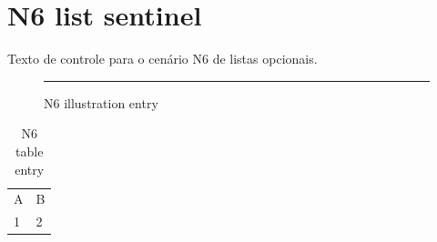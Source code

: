 \documentclass{abntexto-ufc}
\begin{document}
\pretextual

\imprimirlistadeilustracoes
\imprimirlistadetabelas
{}

\textual
\section{N6 list sentinel}
Texto de controle para o cenário N6 de listas opcionais.

\begin{figure}[h]
  \centering
  \rule{10cm}{2cm}
  \caption{N6 illustration entry}
\end{figure}

\begin{table}[h]
  \centering
  \caption{N6 table entry}
  \begin{tabular}{p{4cm}p{4cm}}
    A & B \\
    1 & 2
  \end{tabular}
\end{table}
\end{document}
